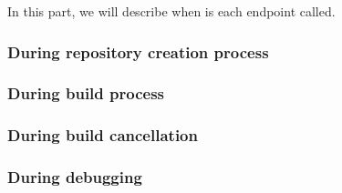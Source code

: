 \documentclass[../main.tex]{subfiles}
\begin{document}
In this part, we will describe when is each endpoint called.

\subsubsection*{During repository creation process}


\subsubsection*{During build process}


\subsubsection*{During build cancellation}


\subsubsection*{During debugging}

\end{document}
